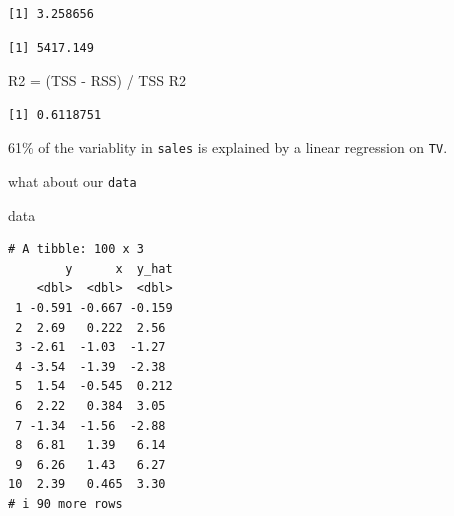 \documentclass[
  letterpaper,
  DIV=11,
  numbers=noendperiod]{scrreprt}
\newenvironment{Shaded}{\begin{snugshade}}{\end{snugshade}}
\newcommand{\DecValTok}[1]{\textcolor[rgb]{0.47,0.16,0.63}{#1}}
\newcommand{\FunctionTok}[1]{\textcolor[rgb]{0.02,0.16,0.49}{#1}}
\newcommand{\NormalTok}[1]{\textcolor[rgb]{0.33,0.33,0.33}{#1}}
\newcommand{\OtherTok}[1]{\textcolor[rgb]{0.85,0.12,0.09}{#1}}
\newcommand{\SpecialCharTok}[1]{\textcolor[rgb]{0.00,0.46,0.62}{#1}}
\begin{document}
\begin{verbatim}
[1] 3.258656
\end{verbatim}

\begin{Shaded}
\end{Shaded}

\begin{verbatim}
[1] 5417.149
\end{verbatim}

\begin{Shaded}
\begin{Highlighting}[]
\NormalTok{R2 }\OtherTok{=}\NormalTok{ (TSS }\SpecialCharTok{{-}}\NormalTok{ RSS) }\SpecialCharTok{/}\NormalTok{ TSS}
\NormalTok{R2}
\end{Highlighting}
\end{Shaded}

\begin{verbatim}
[1] 0.6118751
\end{verbatim}

61\% of the variablity in \texttt{sales} is explained by a linear
regression on \texttt{TV}.

what about our \texttt{data}

\begin{Shaded}
\begin{Highlighting}[]
\NormalTok{data}
\end{Highlighting}
\end{Shaded}

\begin{verbatim}
# A tibble: 100 x 3
        y      x  y_hat
    <dbl>  <dbl>  <dbl>
 1 -0.591 -0.667 -0.159
 2  2.69   0.222  2.56 
 3 -2.61  -1.03  -1.27 
 4 -3.54  -1.39  -2.38 
 5  1.54  -0.545  0.212
 6  2.22   0.384  3.05 
 7 -1.34  -1.56  -2.88 
 8  6.81   1.39   6.14 
 9  6.26   1.43   6.27 
10  2.39   0.465  3.30 
# i 90 more rows
\end{verbatim}

\begin{Shaded}
\end{Shaded}
\end{document}
